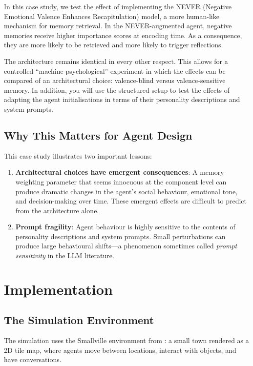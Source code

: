 In this case study, we test the effect of implementing the NEVER (Negative Emotional Valence Enhances Recapitulation) model, a more human-like mechanism for memory retrieval. In the NEVER-augmented agent, negative memories receive higher importance scores at encoding time. As a consequence, they are more likely to be retrieved and more likely to trigger reflections. 

The architecture remains identical in every other respect. This allows for a controlled ``machine-psychological'' experiment in which the effects can be compared of an architectural choice: valence-blind versus valence-sensitive memory. In addition, you will use the structured setup to test the effects of adapting the agent initialisations in terms of their personality descriptions and system prompts. 

\subsection{Why This Matters for Agent Design}

This case study illustrates two important lessons:
\begin{enumerate}
    \item \textbf{Architectural choices have emergent consequences}: A memory weighting parameter that seems innocuous at the component level can produce dramatic changes in the agent's social behaviour, emotional tone, and decision-making over time. These emergent effects are difficult to predict from the architecture alone.
    \item \textbf{Prompt fragility}: Agent behaviour is highly sensitive to the contents of personality descriptions and system prompts. Small perturbations can produce large behavioural shifts---a phenomenon sometimes called \emph{prompt sensitivity} in the LLM literature.
\end{enumerate}


\section{Implementation}

\subsection{The Simulation Environment}

The simulation uses the Smallville environment from \citet{park2023generative}: a small town rendered as a 2D tile map, where agents move between locations, interact with objects, and have conversations.

